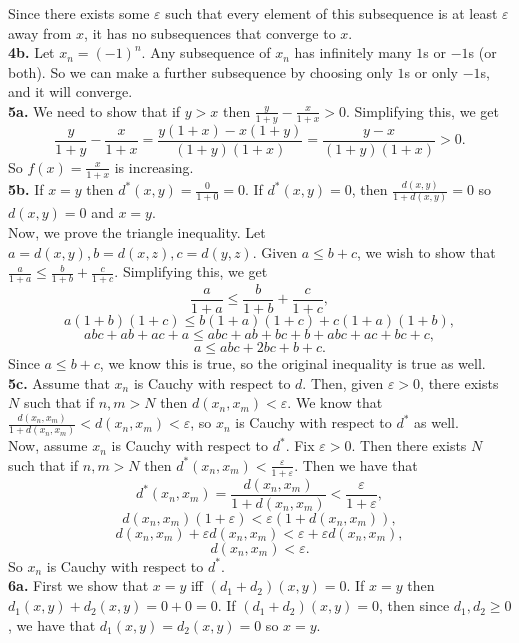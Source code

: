 \documentclass{article}
\newcommand{\eps}{\varepsilon}
\begin{document}
Since there exists some $\eps$ such that every element of this subsequence is at least $\eps$ away from $x$, it has no subsequences that converge to $x$. \\

\textbf{4b.} Let $x_n = (-1)^n$. Any subsequence of $x_n$ has infinitely many $1$s or $-1$s (or both). So we can make a further subsequence by choosing only $1$s or only $-1$s, and it will converge. \\

\textbf{5a.} We need to show that if $y > x$ then $\frac{y}{1 + y} - \frac{x}{1 + x} > 0$. Simplifying this, we get
$$\frac{y}{1 + y} - \frac{x}{1 + x} = \frac{y(1 + x) - x(1 + y)}{(1 + y)(1 + x)} = \frac{y - x}{(1 + y)(1 + x)} > 0.$$
So $f(x) = \frac{x}{1 + x}$ is increasing. \\

\textbf{5b.} If $x = y$ then $d^*(x, y) = \frac{0}{1 + 0} = 0$. If $d^*(x, y) = 0$, then $\frac{d(x, y)}{1 + d(x, y)} = 0$ so $d(x, y) = 0$ and $x = y$. \\

Now, we prove the triangle inequality. Let $a = d(x, y), b = d(x, z), c = d(y, z)$. Given $a \le b + c$, we wish to show that $\frac{a}{1 + a} \le \frac{b}{1 + b} + \frac{c}{1 + c}$. Simplifying this, we get
$$\frac{a}{1 + a} \le \frac{b}{1 + b} + \frac{c}{1 + c},$$
$$a(1 + b)(1 + c) \le b(1 + a)(1 + c) + c(1 + a)(1 + b),$$
$$abc + ab + ac + a \le abc + ab + bc + b + abc + ac + bc + c,$$
$$a \le abc + 2bc + b + c.$$
Since $a \le b + c$, we know this is true, so the original inequality is true as well. \\

\textbf{5c.} Assume that $x_n$ is Cauchy with respect to $d$. Then, given $\eps > 0$, there exists $N$ such that if $n, m > N$ then $d(x_n, x_m) < \eps$. We know that $\frac{d(x_n, x_m)}{1 + d(x_n, x_m)} < d(x_n, x_m) < \eps$, so $x_n$ is Cauchy with respect to $d^*$ as well. \\

Now, assume $x_n$ is Cauchy with respect to $d^*$. Fix $\eps > 0$. Then there exists $N$ such that if $n, m > N$ then $d^*(x_n, x_m) < \frac{\eps}{1 + \eps}$. Then we have that
$$d^*(x_n, x_m) = \frac{d(x_n, x_m)}{1 + d(x_n, x_m)} < \frac{\eps}{1 + \eps},$$
$$d(x_n, x_m)(1 + \eps) < \eps(1 + d(x_n, x_m)),$$
$$d(x_n, x_m) + \eps d(x_n, x_m) < \eps + \eps d(x_n, x_m),$$
$$d(x_n, x_m) < \eps.$$
So $x_n$ is Cauchy with respect to $d^*$. \\

\textbf{6a.} First we show that $x = y$ iff $(d_1 + d_2)(x, y) = 0$. If $x = y$ then $d_1(x, y) + d_2(x, y) = 0 + 0 = 0$. If $(d_1 + d_2)(x, y) = 0$, then since $d_1, d_2 \ge 0$, we have that $d_1(x, y) = d_2(x, y) = 0$ so $x = y$. \\
\end{document}
